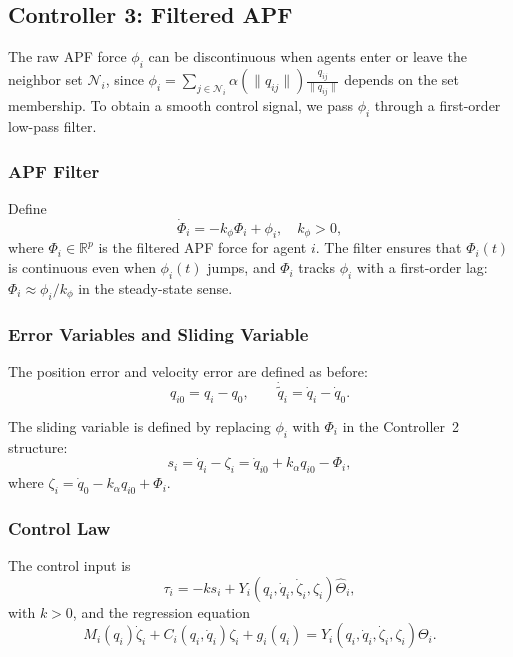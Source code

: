 \subsection{Controller 3: Filtered APF}

The raw APF force $\phi_i$ can be discontinuous when agents enter or leave the neighbor set $\mathcal{N}_i$,
since $\phi_i = \sum_{j\in\mathcal{N}_i} \alpha(\|q_{ij}\|)\frac{q_{ij}}{\|q_{ij}\|}$ depends on the set membership.
To obtain a smooth control signal, we pass $\phi_i$ through a first-order low-pass filter.

\subsubsection{APF Filter}

Define
\begin{equation}\label{eq3:filter}
	\dot{\Phi}_i = -k_\phi\Phi_i + \phi_i,\quad k_\phi > 0,
\end{equation}
where $\Phi_i \in \mathbb{R}^p$ is the filtered APF force for agent $i$.
The filter ensures that $\Phi_i(t)$ is continuous even when $\phi_i(t)$ jumps,
and $\Phi_i$ tracks $\phi_i$ with a first-order lag: $\Phi_i \approx \phi_i/k_\phi$ in the steady-state sense.

\subsubsection{Error Variables and Sliding Variable}

The position error and velocity error are defined as before:
\[
q_{i0} = q_i - q_0,\qquad \dot{\tilde{q}}_i = \dot{q}_i - \dot{q}_0.
\]

The sliding variable is defined by replacing $\phi_i$ with $\Phi_i$ in the Controller~2 structure:
\begin{equation}\label{eq3:sliding_var}
	s_i = \dot{q}_i - \zeta_i = \dot{q}_{i0} + k_\alpha q_{i0} - \Phi_i,
\end{equation}
where $\zeta_i = \dot{q}_0 - k_\alpha q_{i0} + \Phi_i$.

\subsubsection{Control Law}

The control input is
\begin{equation}\label{eq3:control_input}
	\tau_i = -k s_i + Y_i(q_i,\dot{q}_i,\dot{\zeta}_i,\zeta_i) \hat{\Theta}_i,
\end{equation}
with $k > 0$, and the regression equation
\begin{equation}\label{eq3:regression}
	M_i(q_i)\dot{\zeta}_i + C_i(q_i,\dot{q}_i)\zeta_i + g_i(q_i) = Y_i(q_i,\dot{q}_i,\dot{\zeta}_i,\zeta_i)\Theta_i.
\end{equation}


